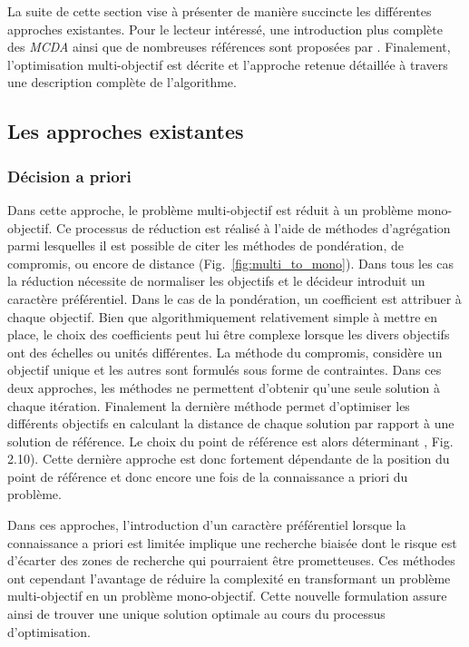 La suite de cette section vise à présenter de manière succincte les différentes
approches existantes. Pour le lecteur intéressé, une introduction plus complète
des \textit{MCDA} ainsi que de nombreuses références sont proposées par \textcite{BenMena2000}.
Finalement, l’optimisation multi-objectif est décrite et l’approche retenue
détaillée à travers une description complète de l’algorithme.

\subsection{Les approches existantes} %
\label{sub:les_approches_existantes}
\subsubsection{Décision a priori} %
\label{ssub:decision_a_priori}
Dans cette approche, le problème multi-objectif est réduit à un problème mono-objectif.
Ce processus de réduction est réalisé à l’aide de méthodes d’agrégation parmi lesquelles
il est possible de citer les méthodes de pondération, de compromis,
ou encore de distance (Fig.~\ref{fig:multi_to_mono}). Dans tous les cas la réduction
nécessite de normaliser les objectifs et le décideur introduit un caractère préférentiel.
Dans le cas de la pondération, un coefficient est attribuer à chaque objectif. Bien que
algorithmiquement relativement simple à mettre en place, le choix des coefficients peut
lui être complexe lorsque les divers objectifs ont des échelles ou unités différentes.
La méthode du compromis, considère un objectif unique et les autres sont formulés
sous forme de contraintes. Dans ces deux approches, les méthodes ne permettent
d’obtenir qu’une seule solution à chaque itération.
Finalement la dernière méthode permet d’optimiser les différents objectifs en calculant
la distance de chaque solution par rapport à une solution de référence. Le choix
du point de référence est alors déterminant \parencite{Collette2002}, Fig. 2.10).
Cette dernière approche est donc fortement dépendante de la position du point de
référence et donc encore une fois de la connaissance a priori du problème.

Dans ces approches, l’introduction d’un caractère préférentiel lorsque la connaissance a priori
est limitée implique une recherche biaisée dont le risque est d’écarter des zones
de recherche qui pourraient être prometteuses. Ces méthodes ont cependant l’avantage
de réduire la complexité en transformant un problème multi-objectif en un problème
mono-objectif. Cette nouvelle formulation assure ainsi de trouver une unique solution
optimale au cours du processus d’optimisation.

